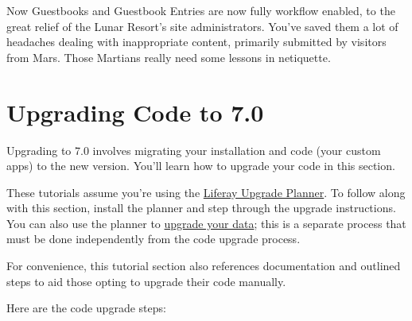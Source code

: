 Now Guestbooks and Guestbook Entries are now fully workflow enabled, to
the great relief of the Lunar Resort's site administrators. You've saved
them a lot of headaches dealing with inappropriate content, primarily
submitted by visitors from Mars. Those Martians really need some lessons
in netiquette.

\chapter{Upgrading Code to 7.0}\label{upgrading-code-to-7.0}

Upgrading to 7.0 involves migrating your installation and code (your
custom apps) to the new version. You'll learn how to upgrade your code
in this section.

These tutorials assume you're using the
\href{/docs/7-2/reference/-/knowledge_base/r/liferay-upgrade-planner}{Liferay
Upgrade Planner}. To follow along with this section, install the planner
and step through the upgrade instructions. You can also use the planner
to
\href{/docs/7-2/deploy/-/knowledge_base/d/upgrading-to-product-ver}{upgrade
your data}; this is a separate process that must be done independently
from the code upgrade process.

For convenience, this tutorial section also references documentation and
outlined steps to aid those opting to upgrade their code manually.

Here are the code upgrade steps:

